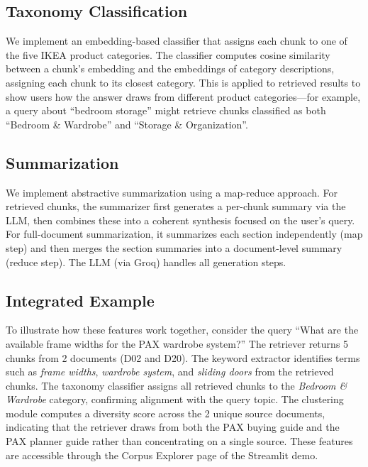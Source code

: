 \documentclass[conference]{IEEEtran}
\begin{document}
\subsection{Taxonomy Classification}

We implement an embedding-based classifier that assigns each chunk to one of the five IKEA product categories. The classifier computes cosine similarity between a chunk's embedding and the embeddings of category descriptions, assigning each chunk to its closest category. This is applied to retrieved results to show users how the answer draws from different product categories---for example, a query about ``bedroom storage'' might retrieve chunks classified as both ``Bedroom \& Wardrobe'' and ``Storage \& Organization''.

\subsection{Summarization}

We implement abstractive summarization using a map-reduce approach. For retrieved chunks, the summarizer first generates a per-chunk summary via the LLM, then combines these into a coherent synthesis focused on the user's query. For full-document summarization, it summarizes each section independently (map step) and then merges the section summaries into a document-level summary (reduce step). The LLM (via Groq) handles all generation steps.

\subsection{Integrated Example}

To illustrate how these features work together, consider the query ``What are the available frame widths for the PAX wardrobe system?'' The retriever returns 5 chunks from 2 documents (D02 and D20). The keyword extractor identifies terms such as \textit{frame widths}, \textit{wardrobe system}, and \textit{sliding doors} from the retrieved chunks. The taxonomy classifier assigns all retrieved chunks to the \textit{Bedroom \& Wardrobe} category, confirming alignment with the query topic. The clustering module computes a diversity score across the 2 unique source documents, indicating that the retriever draws from both the PAX buying guide and the PAX planner guide rather than concentrating on a single source. These features are accessible through the Corpus Explorer page of the Streamlit demo.

\end{document}
